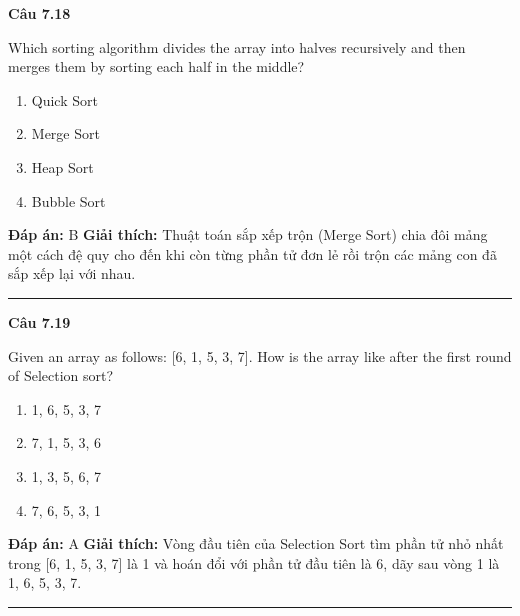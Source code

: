\documentclass[11pt,a4paper]{article}
\newenvironment{question}[1]{%
  \par\vspace{1em}\noindent\textbf{\large Câu #1}\par\vspace{0.4em}
}{%
  \par\vspace{1em}\hrule\vspace{0.6em}
}
\newenvironment{choices}{%
  \begin{enumerate}[label=\textbf{\Alph*.},leftmargin=2.2em,itemsep=2pt,topsep=3pt]
}{%
  \end{enumerate}
}
\newcommand{\choice}{\item}
\begin{document}
\begin{question}{7.18}
Which sorting algorithm divides the array into halves recursively and then merges them by sorting each half in the middle?
\begin{choices}
\choice Quick Sort
\choice Merge Sort
\choice Heap Sort
\choice Bubble Sort
\end{choices}
\textbf{Đáp án:} B
\textbf{Giải thích:} Thuật toán sắp xếp trộn (Merge Sort) chia đôi mảng một cách đệ quy cho đến khi còn từng phần tử đơn lẻ rồi trộn các mảng con đã sắp xếp lại với nhau.
\end{question}

\begin{question}{7.19}
Given an array as follows: [6, 1, 5, 3, 7]. How is the array like after the first round of Selection sort?
\begin{choices}
\choice 1, 6, 5, 3, 7
\choice 7, 1, 5, 3, 6
\choice 1, 3, 5, 6, 7
\choice 7, 6, 5, 3, 1
\end{choices}
\textbf{Đáp án:} A
\textbf{Giải thích:} Vòng đầu tiên của Selection Sort tìm phần tử nhỏ nhất trong [6, 1, 5, 3, 7] là 1 và hoán đổi với phần tử đầu tiên là 6, dãy sau vòng 1 là 1, 6, 5, 3, 7.
\end{question}
\end{document}
